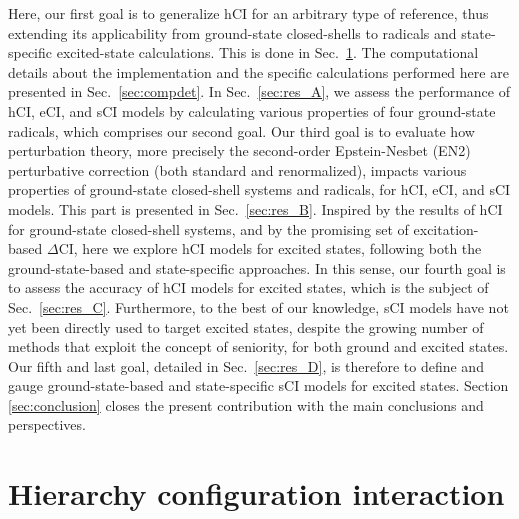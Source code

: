 \documentclass[aip,jcp,reprint,noshowkeys,superscriptaddress]{revtex4-1}
\begin{document}
Here, our first goal is to generalize hCI for an arbitrary type of reference, thus extending its applicability from ground-state closed-shells \cite{Kossoski_2022}
to radicals and state-specific excited-state calculations.
This is done in Sec.~\ref{sec:hCI}.
The computational details about the implementation and the specific calculations performed here are presented in Sec.~\ref{sec:compdet}.
In Sec.~\ref{sec:res_A}, we assess the performance of hCI, eCI, and sCI models by calculating various properties of four ground-state radicals, which comprises our second goal.
Our third goal is to evaluate how perturbation theory, more precisely the second-order Epstein-Nesbet (EN2) perturbative correction (both standard and renormalized), \cite{Garniron_2019}
impacts various properties of ground-state closed-shell systems and radicals, for hCI, eCI, and sCI models.
This part is presented in Sec.~\ref{sec:res_B}.
Inspired by the results of hCI for ground-state closed-shell systems, \cite{Kossoski_2022}
and by the promising set of excitation-based $\Delta$CI, \cite{Kossoski_2023} here we explore hCI models for excited states, following both the ground-state-based and state-specific approaches.
In this sense, our fourth goal is to assess the accuracy of hCI models for excited states, which is the subject of Sec.~\ref{sec:res_C}.
Furthermore, to the best of our knowledge, sCI models have not yet been directly used to target excited states,
despite the growing number of methods that exploit the concept of seniority,
for both ground
\cite{Limacher_2013,Limacher_2014,Tecmer_2014,Boguslawski_2014a,Boguslawski_2015,Boguslawski_2014b,Boguslawski_2014c,Johnson_2020,Henderson_2014,Stein_2014,Henderson_2015,Chen_2015,Bytautas_2018,Marie_2021,Boguslawski_2021,Tecmer_2022,Mamache_2023}
and excited states.
\cite{Boguslawski_2016b,Boguslawski_2016c,Boguslawski_2019,Nowak_2019,Kossoski_2021,Marie_2021,Tecmer_2022,Rishi_2023,Nowak_2023}
Our fifth and last goal, detailed in Sec.~\ref{sec:res_D}, is therefore to define and gauge ground-state-based and state-specific sCI models for excited states.
Section \ref{sec:conclusion} closes the present contribution with the main conclusions and perspectives.


\section{Hierarchy configuration interaction}
\label{sec:hCI}
\end{document}
